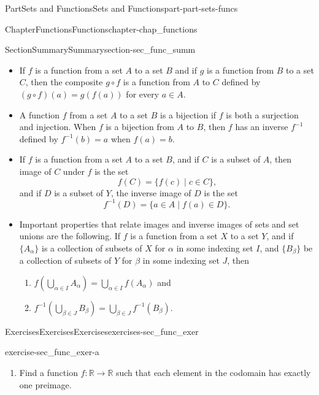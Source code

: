 \documentclass[oneside,10pt,]{book}
\numberwithin{equation}{chapter}
\newcommand{\R}{\mathbb{R}}
\begin{document}
\begin{partptx}{Part}{Sets and Functions}{}{Sets and Functions}{}{}{part-part-sets-funcs}
\begin{chapterptx}{Chapter}{Functions}{}{Functions}{}{}{chapter-chap_functions}
\begin{sectionptx}{Section}{Summary}{}{Summary}{}{}{section-sec_func_summ}
\begin{itemize}[label=\textbullet]
\item{}If \(f\) is a function from a set \(A\) to a set \(B\) and if \(g\) is a function from \(B\) to a set \(C\), then the composite \(g \circ f\) is a function from \(A\) to \(C\) defined by \((g \circ f)(a) = g(f(a))\) for every \(a \in A\).%
\item{}A function \(f\) from a set \(A\) to a set \(B\) is a bijection if \(f\) is both a surjection and injection. When \(f\) is a bijection from \(A\) to \(B\), then \(f\) has an inverse \(f^{-1}\) defined by \(f^{-1}(b) = a\) when \(f(a) = b\).%
\item{}If \(f\) is a function from a set \(A\) to a set \(B\), and if \(C\) is a subset of \(A\), then image of \(C\) under \(f\) is the set%
\begin{equation*}
f(C) = \{f(c) \mid c \in C\}\text{,}
\end{equation*}
and if \(D\) is a subset of \(Y\), the inverse image of \(D\) is the set%
\begin{equation*}
f^{-1}(D) = \{a \in A \mid f(a) \in D\}\text{.}
\end{equation*}
%
\item{}Important properties that relate images and inverse images of sets and set unions are the following. If \(f\) is a function from a set \(X\) to a set \(Y\), and if \(\{A_{\alpha}\}\) is a collection of subsets of \(X\) for \(\alpha\) in some indexing set \(I\), and \(\{B_{\beta}\}\) be a collection of subsets of \(Y\) for \(\beta\) in some indexing set \(J\), then%
\begin{enumerate}[label=\roman*]
\item{}\(f\left(\bigcup_{\alpha \in I} A_{\alpha}\right) = \bigcup_{\alpha \in I} f(A_{\alpha})\) and%
\item{}\(f^{-1}\left(\bigcup_{\beta \in J} B_{\beta}\right) = \bigcup_{\beta \in J} f^{-1}(B_{\beta})\).%
\end{enumerate}
%
\end{itemize}
%
\end{sectionptx}
%
%
\typeout{************************************************}
\typeout{************************************************}
%
\begin{exercises-section}{Exercises}{Exercises}{}{Exercises}{}{}{exercises-sec_func_exer}
\begin{divisionexercise}{1}{}{}{exercise-sec_func_exer-a}%
\begin{enumerate}[font=\bfseries,label=(\alph*),ref=\alph*]%
\item{}Find a function \(f: \R \to \R\) such that each element in the codomain has exactly one preimage.%

\end{enumerate}
\end{divisionexercise}
\end{exercises-section}
\end{chapterptx}
\end{partptx}
\end{document}
